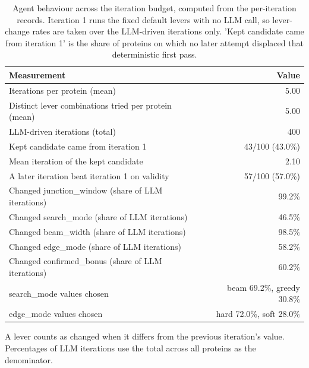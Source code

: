 \begin{table}[htbp]
  \centering
  \caption{Agent behaviour across the iteration budget, computed from the per-iteration records. Iteration 1 runs the fixed default levers with no LLM call, so lever-change rates are taken over the LLM-driven iterations only. 'Kept candidate came from iteration 1' is the share of proteins on which no later attempt displaced that deterministic first pass.}
  \label{tab:agent_behaviour}
  \begin{tabular}{lr}
    \toprule
    Measurement & Value \\
    \midrule
    Iterations per protein (mean) & 5.00 \\
    Distinct lever combinations tried per protein (mean) & 5.00 \\
    LLM-driven iterations (total) & 400 \\
    Kept candidate came from iteration 1 & 43/100 (43.0\%) \\
    Mean iteration of the kept candidate & 2.10 \\
    A later iteration beat iteration 1 on validity & 57/100 (57.0\%) \\
    Changed junction\_window (share of LLM iterations) & 99.2\% \\
    Changed search\_mode (share of LLM iterations) & 46.5\% \\
    Changed beam\_width (share of LLM iterations) & 98.5\% \\
    Changed edge\_mode (share of LLM iterations) & 58.2\% \\
    Changed confirmed\_bonus (share of LLM iterations) & 60.2\% \\
    search\_mode values chosen & beam 69.2\%, greedy 30.8\% \\
    edge\_mode values chosen & hard 72.0\%, soft 28.0\% \\
    \bottomrule
  \end{tabular}
  \par\smallskip\footnotesize{A lever counts as changed when it differs from the previous iteration's value. Percentages of LLM iterations use the total across all proteins as the denominator.}
\end{table}
